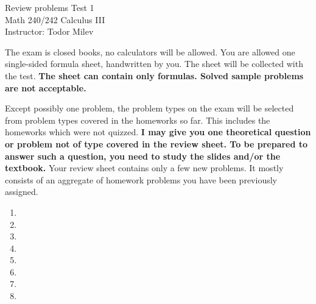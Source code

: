 \documentclass{article}
\begin{document}
\begin{center}
\Large
Review problems Test 1\\ Math 240/242 Calculus III \\ \normalsize Instructor: Todor Milev
\end{center}


\noindent The exam is closed books, no calculators will be allowed. You are allowed one single-sided formula sheet, handwritten by you. The sheet will be collected with the test. \textbf{The sheet can contain only formulas. Solved sample problems are not acceptable.}


Except possibly one problem, the problem types on the exam will be selected from problem types covered in the homeworks so far. This includes the homeworks which were not quizzed. \textbf{I may give you one theoretical question or problem not of type covered in the review sheet. To be prepared to answer such a question, you need to study the slides and/or the textbook.} Your review sheet contains only a few new problems. It mostly consists of an aggregate of homework problems you have been previously assigned. 

\begin{enumerate}
\item 

\item  
\item 



\item 
\item 

\item 
\item 

\item 



\end{enumerate}
\end{document}
